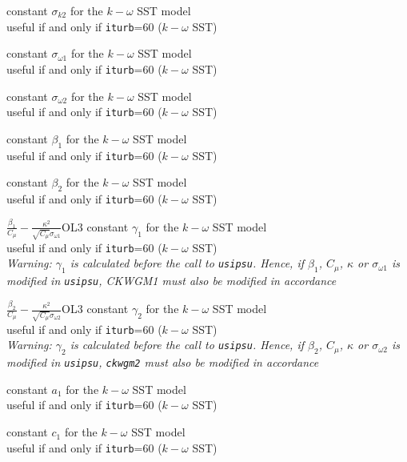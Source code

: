 {constant $\sigma_{k2}$ for the $k-\omega$ SST model\\
useful if and only if {\tt iturb}=60
($k-\omega$ SST)}

{constant $\sigma_{\omega 1}$ for the $k-\omega$ SST model\\
useful if and only if {\tt iturb}=60
($k-\omega$ SST)}

{constant $\sigma_{\omega 2}$ for the $k-\omega$ SST model\\
useful if and only if {\tt iturb}=60
($k-\omega$ SST)}

{constant $\beta_1$ for the $k-\omega$ SST model\\
useful if and only if {\tt iturb}=60
($k-\omega$ SST)}

{constant $\beta_2$ for the $k-\omega$ SST model\\
useful if and only if {\tt iturb}=60
($k-\omega$ SST)}

{$\frac{\beta_1}{C_\mu}-\frac{\kappa^2}{\sqrt{C_\mu}\sigma_{\omega 1}}$}{O}{L3}
{constant $\gamma_1$ for the $k-\omega$ SST model\\
useful if and only if {\tt iturb}=60
($k-\omega$ SST)\\
{\em Warning: $\gamma_1$ is calculated before the call to
\texttt{usipsu}. Hence, if $\beta_1$, $C_\mu$, $\kappa$ or $\sigma_{\omega 1}$
is modified in \texttt{usipsu}, CKWGM1 must also be modified in accordance}}

{$\frac{\beta_2}{C_\mu}-\frac{\kappa^2}{\sqrt{C_\mu}\sigma_{\omega 2}}$}{O}{L3}
{constant $\gamma_2$ for the $k-\omega$ SST model\\
useful if and only if {\tt iturb}=60
($k-\omega$ SST)\\
{\em Warning: $\gamma_2$ is calculated before the call to
\texttt{usipsu}. Hence, if $\beta_2$, $C_\mu$, $\kappa$ or $\sigma_{\omega 2}$
is modified in \texttt{usipsu}, \texttt{ckwgm2} must also be modified in
accordance}}

{constant $a_1$ for the $k-\omega$ SST model\\
useful if and only if {\tt iturb}=60
($k-\omega$ SST)}

{constant $c_1$ for the $k-\omega$ SST model\\
useful if and only if {\tt iturb}=60
($k-\omega$ SST)}


